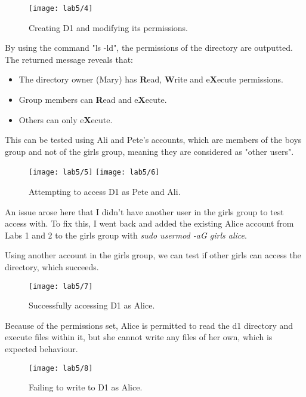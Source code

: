 \begin{figure}[H]
    \centering
    \texttt{[image: lab5/4]}
    \caption{Creating D1 and modifying its permissions.}
    \label{fig:D1}
\end{figure}

\noindent By using the command "ls -ld", the permissions of the directory are outputted.
The returned message reveals that:
\begin{itemize}
    \item The directory owner (Mary) has \textbf{R}ead, \textbf{W}rite and e\textbf{X}ecute permissions.
    \item Group members can \textbf{R}ead and e\textbf{X}ecute.
    \item Others can only e\textbf{X}ecute.
\end{itemize}

This can be tested using Ali and Pete's accounts, which are members of the boys group and not of the
girls group, meaning they are considered as "other users".

\begin{figure}[H]
    \centering
    \texttt{[image: lab5/5]}
    \texttt{[image: lab5/6]}
    \caption{Attempting to access D1 as Pete and Ali.}
    \label{fig:boysD1}
\end{figure}

\begin{tcolorbox}[colback=orange!5!white,colframe=orange!75!black,title=Note]
    An issue arose here that I didn't have another user in the girls group to test access with.
    To fix this, I went back and added the existing Alice account from Labs 1 and 2 to the girls group
    with \textit{sudo usermod -aG girls alice}.
\end{tcolorbox}

Using another account in the girls group, we can test if other girls can access the directory,
which succeeds.

\begin{figure}[H]
    \centering
    \texttt{[image: lab5/7]}
    \caption{Successfully accessing D1 as Alice.}
    \label{fig:girlsD1}
\end{figure}

Because of the permissions set, Alice is permitted to read the d1 directory and execute files
within it, but she cannot write any files of her own, which is expected behaviour.

\begin{figure}[H]
    \centering
    \texttt{[image: lab5/8]}
    \caption{Failing to write to D1 as Alice.}
    \label{fig:girlsWriteD1Fail}
\end{figure}

